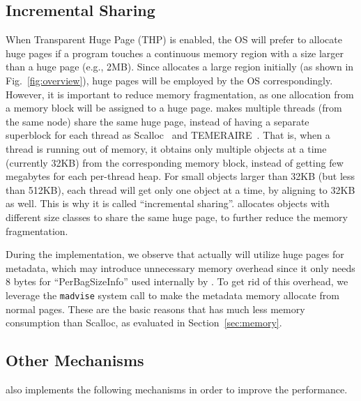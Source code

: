 \subsection{Incremental Sharing}
\label{sec:hugepages}
When Transparent Huge Page (THP) is enabled, the OS will prefer to allocate huge pages if a program touches a continuous memory region with a size larger than a huge page (e.g., 2MB). Since \NM{} allocates a large region initially (as shown in Fig.~\ref{fig:overview}), huge pages will be employed by the OS correspondingly. However, it is important to reduce memory fragmentation, as one allocation from a memory block will be assigned to a huge page.
\NM{} makes multiple threads (from the same node) share the same huge page, instead of having a separate superblock for each thread as Scalloc~\cite{Scalloc} and TEMERAIRE~\cite{TEMERAIRE}. That is, when a thread is running out of memory, it obtains only multiple objects at a time (currently 32KB) from the corresponding memory block, instead of getting few megabytes for each per-thread heap. For small objects larger than 32KB (but less than 512KB), each thread will get only one object at a time, by aligning to 32KB as well.  This is why it is called ``incremental sharing''. 
\NM{} allocates objects with different size classes to share the same huge page, to further reduce the memory fragmentation. 

During the implementation, we observe that \NM{} actually will utilize huge pages for metadata, which may introduce unnecessary memory overhead since it only needs 8 bytes for ``PerBagSizeInfo'' used internally by \NM{}. To get rid of this overhead, we leverage the \texttt{madvise} system call to make the metadata memory allocate from normal pages. These are the basic reasons that \NM{} has much less memory consumption than Scalloc, as evaluated in Section~\ref{sec:memory}. 

\subsection{Other Mechanisms}
\label{sec:others}

\NM{} also implements the following mechanisms in order to improve the performance.



